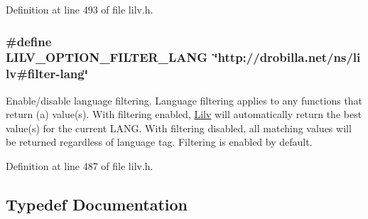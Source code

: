 Definition at line 493 of file lilv.\+h.

\subsubsection[{\texorpdfstring{L\+I\+L\+V\+\_\+\+O\+P\+T\+I\+O\+N\+\_\+\+F\+I\+L\+T\+E\+R\+\_\+\+L\+A\+NG}{LILV_OPTION_FILTER_LANG}}]{\setlength{\rightskip}{0pt plus 5cm}\#define L\+I\+L\+V\+\_\+\+O\+P\+T\+I\+O\+N\+\_\+\+F\+I\+L\+T\+E\+R\+\_\+\+L\+A\+NG~\char`\"{}http\+://drobilla.\+net/{\bf ns}/lilv\#{\bf filter}-\/lang\char`\"{}}\hypertarget{group__lilv_ga01ba858cfabdfef1b74bdc2b7dad8f61}{}\label{group__lilv_ga01ba858cfabdfef1b74bdc2b7dad8f61}
Enable/disable language filtering. Language filtering applies to any functions that return (a) value(s). With filtering enabled, \hyperlink{namespace_lilv}{Lilv} will automatically return the best value(s) for the current L\+A\+NG. With filtering disabled, all matching values will be returned regardless of language tag. Filtering is enabled by default. 

Definition at line 487 of file lilv.\+h.



\subsection{Typedef Documentation}
